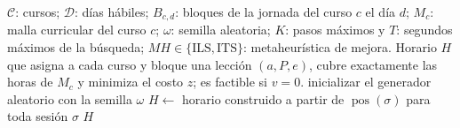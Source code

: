 \documentclass{article}
\begin{document}
\begin{algorithm}[H]
\caption{$\textsc{GenerarHorario}(\mathcal{C}, \mathcal{D}, B, M, \omega, K, T, \mathit{MH})$}
\label{alg:generar}
\begin{algorithmic}[1]
\Require $\mathcal{C}$: cursos; $\mathcal{D}$: días hábiles;
         $B_{c,d}$: bloques de la jornada del curso $c$ el día $d$;
         $M_c$: malla curricular del curso $c$;
         $\omega$: semilla aleatoria;
         $K$: pasos máximos y $T$: segundos máximos de la búsqueda;
         $\mathit{MH} \in \{\text{ILS}, \text{ITS}\}$: metaheurística de mejora.
\Ensure Horario $H$ que asigna a cada curso y bloque una lección $(a, P, e)$, cubre
        exactamente las horas de $M_c$ y minimiza el costo $z$; es factible si $v = 0$.
\State inicializar el generador aleatorio con la semilla $\omega$ 
\State {} 
\State {} 
    \State {} 
\Else
    \State {} 
\EndIf
\State $H \gets$ horario construido a partir de $\operatorname{pos}(\sigma)$ para toda sesión $\sigma$
\State \Return $H$
\end{algorithmic}
\end{algorithm}
\end{document}
